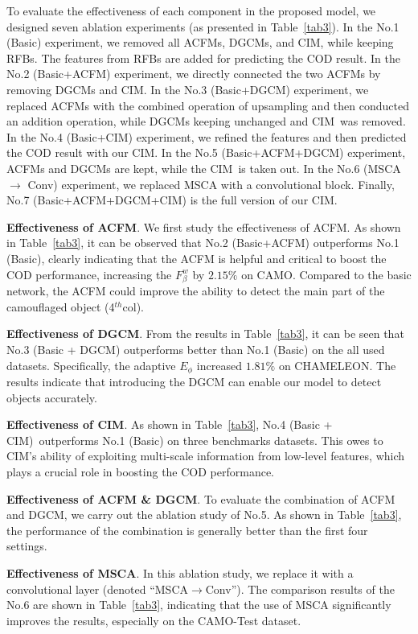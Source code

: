 \documentclass[lettersize,journal]{IEEEtran}
\newcommand{\ourB}{CIM} %
\begin{document}
To evaluate the effectiveness of each component in the proposed model, we designed seven ablation experiments (as presented in Table~\ref{tab3}). In the No.1 (Basic) experiment, we removed all ACFMs, DGCMs, and \ourB, while keeping RFBs. The features from RFBs are added for predicting the COD result.
In the No.2 (Basic+ACFM) experiment, we directly connected the two ACFMs by removing DGCMs and \ourB. In the No.3 (Basic+DGCM) experiment, we replaced ACFMs with the combined operation of upsampling and then conducted an addition operation, while DGCMs keeping unchanged and \ourB~was removed. In the No.4 (Basic+\ourB) experiment, we refined the features and then predicted the COD result with our \ourB.
In the No.5 (Basic+ACFM+DGCM) experiment, ACFMs and DGCMs are kept, while the \ourB~is taken out. In the No.6 ({MSCA} $\rightarrow$ {Conv}) experiment, we replaced MSCA with a convolutional block. Finally, No.7 (Basic+ACFM+DGCM+\ourB) is the full version of our \ourB. \par

\textbf{Effectiveness of ACFM}. We first study the effectiveness of ACFM. As shown in Table~\ref{tab3}, it can be observed that No.2 (Basic+ACFM) outperforms No.1 (Basic), clearly indicating that the ACFM is helpful and critical to boost the COD performance, increasing the $F_\beta^w$ by $2.15\%$ on CAMO. Compared to the basic network, the ACFM could improve the ability to detect the main part of the camouflaged object (4$^{th}$col).

\textbf{Effectiveness of DGCM}. From the results in Table~\ref{tab3}, it can be seen that No.3 (Basic + DGCM) outperforms better than No.1 (Basic) on the all used datasets. Specifically, the adaptive $E_\phi$ increased  $1.81\%$ on CHAMELEON. The results indicate that introducing the DGCM can enable our model to detect objects accurately.

\textbf{Effectiveness of \ourB}. As shown in Table~\ref{tab3}, No.4 (Basic + CIM)~outperforms No.1 (Basic) on three benchmarks datasets. This owes to CIM's ability of exploiting multi-scale information from low-level features, which plays a crucial role in boosting the COD performance.

\textbf{Effectiveness of ACFM \& DGCM}. To evaluate the combination of ACFM and DGCM, we carry out the ablation study of No.5. As shown in Table~\ref{tab3}, the performance of the combination is generally better than the first four settings.

\textbf{Effectiveness of MSCA}. In this ablation study, we replace it with a convolutional layer (denoted ``MSCA$\rightarrow$Conv''). The comparison results of the No.6 are shown in Table~\ref{tab3}, indicating that the use of MSCA significantly improves the results, especially on the CAMO-Test dataset.
\end{document}
